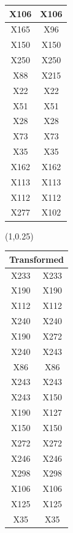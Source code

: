 \documentclass{beamer}
\newcommand{\boz}{\cellcolor{pathwaynode}}
\newcommand{\ghool}{\cellcolor{independentnode}}
\begin{document}
\begin{frame}
\begin{textblock*}{\paperwidth}
\begin{tabular}{| c c |}
X106   &  X106  \\ \hline
X165   &  \ghool X96  \\ \hline
\boz X150   &  \boz X150  \\ \hline
X250   &  X250  \\ \hline
\ghool X88   &  X215  \\ \hline
\boz X22   &  \boz X22  \\ \hline
X51   &  X51  \\ \hline
X28   &  X28  \\ \hline
X73   &  X73  \\ \hline
X35   &  X35  \\ \hline
X162   &  X162  \\ \hline
\boz X113   &  \boz X113  \\ \hline
X112   &  X112  \\ \hline
X277   &  X102  \\ \hline
    \end{tabular}
    \hspace{.5em}
  \end{textblock*}
  \begin{textblock*}{\paperwidth}(1\textwidth,0.25\textheight)
    \raggedright 
    \tiny
    \begin{tabular}{| c c |}
      \hline
\toprule
\multicolumn{2}{c}{Transformed} \\ 
\midrule \hline
X233   &  X233  \\ \hline
\boz X190   &  \boz X190  \\ \hline
X112   &  X112  \\ \hline
\boz X240   &  \boz X240  \\ \hline
\boz X190   &  \boz X272  \\ \hline
\boz X240   &  \boz X243  \\ \hline
X86   &  X86  \\ \hline
\boz X243   &  \boz X243  \\ \hline
\boz X243   &  \boz X150  \\ \hline
\boz X190   &  X127  \\ \hline
\boz X150   &  \boz X150  \\ \hline
\boz X272   &  \boz X272  \\ \hline
X246   &  X246  \\ \hline
X298   &  X298  \\ \hline
X106   &  X106  \\ \hline
\boz X125   &  \boz X125  \\ \hline
X35   &  X35  \\ \hline

\end{tabular}
\end{textblock*}
\end{frame}
\end{document}
